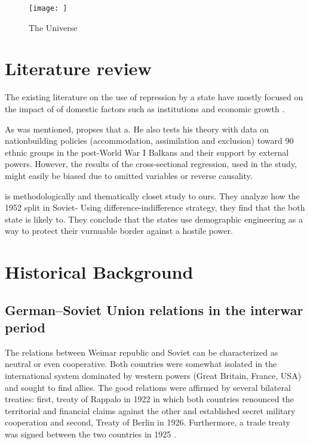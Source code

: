\documentclass[12pt]{article}
\begin{document}





\begin{figure}[h!]
\centering
\texttt{[image: ]}
\caption{The Universe}
\label{fig:universe}
\end{figure}
\section{Literature review}
The existing literature on the use of repression by a state have mostly focused on the impact of  of domestic factors such as institutions and economic growth \citep{davenport_state_2007, davenport_state_2007-1}.

As was mentioned, \citet{mylonas_politics_2013} propses that a. He also tests his theory with data on nationbuilding policies (accommodation, assimilation and exclusion) toward  90 ethnic groups in the post-World War I Balkans and their support by external powers. However, the results of the cross-sectional regression, used in the study, might easily be biased due to omitted variables or reverse causality. 

 \citet{blaydes_state_2018} 

\citet{mcnamee_demographic_nodate} is methodologically and thematically closet study to ours. They analyze how the 1952 split in Soviet-
Using difference-indifference strategy, they find that the both state is likely to. They conclude that the states use demographic engineering as a way to protect their vurnuable border against a hostile power. 

\section{Historical Background}
\subsection{German–Soviet Union relations in the interwar period}
The relations between Weimar republic and Soviet can be characterized as neutral or even cooperative. Both countries were somewhat isolated in the international system dominated by western powers (Great Britain, France, USA) and sought to find allies. The good relations were affirmed by several bilateral treaties: first, treaty of Rappalo in 1922 in which both countries renounced the territorial and financial claims against the other and established secret military cooperation and second, Treaty of Berlin in 1926. Furthermore, a trade treaty was signed between the two countries in 1925 \citep{morgan_political_1963}.
\end{document}
